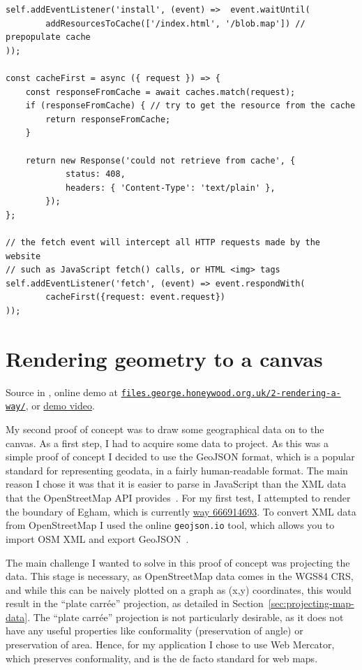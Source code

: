 \documentclass[hyphens]{final_report}
\begin{document}
\begin{lstlisting}[caption=Using the Service Worker cache]
self.addEventListener('install', (event) =>  event.waitUntil(
        addResourcesToCache(['/index.html', '/blob.map']) // prepopulate cache
));

const cacheFirst = async ({ request }) => {
    const responseFromCache = await caches.match(request);
    if (responseFromCache) { // try to get the resource from the cache
        return responseFromCache;
    }

    return new Response('could not retrieve from cache', {
            status: 408,
            headers: { 'Content-Type': 'text/plain' },
        });
};

// the fetch event will intercept all HTTP requests made by the website
// such as JavaScript fetch() calls, or HTML <img> tags
self.addEventListener('fetch', (event) => event.respondWith(
        cacheFirst({request: event.request})
));
\end{lstlisting}

\section{Rendering geometry to a canvas}

{ \footnotesize Source in , online demo at \href{https://files.george.honeywood.org.uk/2-rendering-a-way/}{\nolinkurl{files.george.honeywood.org.uk/2-rendering-a-way/}}, or \href{https://youtu.be/2F_vpCrQsO4}{demo video}.}

My second proof of concept was to draw some geographical data on to the canvas. As a first step, I had to acquire some data to project. As this was a simple proof of concept I decided to use the GeoJSON format, which is a popular standard for representing geodata, in a fairly human-readable format. The main reason I chose it was that it is easier to parse in JavaScript than the XML data that the OpenStreetMap API provides~\cite{osm-api-wiki}. For my first test, I attempted to render the boundary of Egham, which is currently \href{https://www.openstreetmap.org/way/666914693}{way 666914693}. To convert XML data from OpenStreetMap I used the online \texttt{geojson.io} tool, which allows you to import OSM XML and export GeoJSON~\cite{geojson.io}.

The main challenge I wanted to solve in this proof of concept was projecting the data. This stage is necessary, as OpenStreetMap data comes in the WGS84 CRS, and while this can be naively plotted on a graph as (x,y) coordinates, this would result in the ``plate carrée'' projection, as detailed in Section~\ref{sec:projecting-map-data}. The ``plate carrée'' projection is not particularly desirable, as it does not have any useful properties like conformality (preservation of angle) or preservation of area. Hence, for my application I chose to use Web Mercator, which preserves conformality, and is the de facto standard for web maps.
\end{document}
